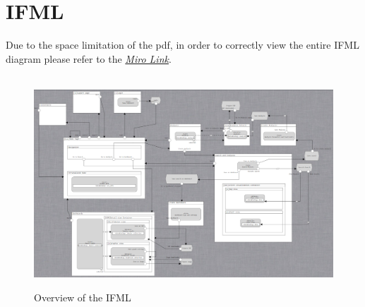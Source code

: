 \documentclass[../main.tex]{subfiles}
\begin{document}
    \chapter{IFML}\label{ch:ifml}
    Due to the space limitation of the pdf, in order to correctly view the entire IFML diagram please refer to the \href{https://miro.com/app/board/o9J_kuKN_dk=/}{\textit{Miro Link}}.
    \\
    \\
    \begin{figure}[H]
        \centering
        \includegraphics[scale = 1.5]{assets/ifml/ifml_sum.png} \\
        \caption[]{Overview of the IFML}\label{fig:figure4}
    \end{figure}
\end{document}
